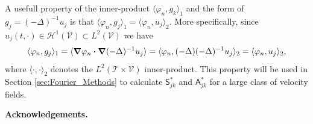 \documentclass[leqno,onefignum,onetabnum]{siamltex1213}
\newcommand{\Tc}{\mathcal{T}}
\newcommand{\Vc}{\mathcal{V}}
\newcommand{\Sm}{\mathsf{S}}
\newcommand{\Am}{\mathsf{A}}
\newcommand{\Hs}{\mathscr{H}}
\newcommand\bnabla{\mbox{\boldmath${\nabla}$}}
\providecommand\bcdot{\boldsymbol{\cdot}}
\begin{document}
A usefull property of the inner-product $\langle\varphi_n,g_k\rangle_1$ and the form of
$g_j=(-\Delta)^{-1}u_j$ is that $\langle\varphi_n,g_j\rangle_1=\langle\varphi_n,u_j\rangle_2$. More
specifically, since $u_j(t,\cdot)\in\Hs^1(\Vc)\subset L^2(\Vc)$ we have
\cite{Stakgold:BVP:2000}  
%
\begin{align}\label{eq:H1_to_L2}
  \langle\varphi_n,g_j\rangle_1=\langle\bnabla \varphi_n\bcdot\bnabla (-\Delta)^{-1}u_j\rangle
         =\langle\varphi_n,(-\Delta)(-\Delta)^{-1}u_j\rangle_2
         =\langle\varphi_n,u_j\rangle_2,
\end{align}
%
where $\langle\cdot,\cdot\rangle_2$ denotes the $L^2(\Tc\times\Vc)$ inner-product. This
property will be used in Section \ref{sec:Fourier_Methods} to
calculate $\Sm^*_{jk}$ and $\Am^*_{jk}$ for a large class of velocity
fields.   







\medskip

{\bf Acknowledgements.}


\medskip









\end{document}
